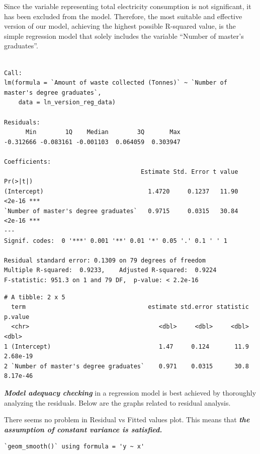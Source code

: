 \documentclass[
  11pt,
  a4paper,
  DIV=11,
  numbers=noendperiod]{scrartcl}
\begin{document}
{Since the variable representing total electricity consumption is not
significant, it has been excluded from the model.} Therefore, the most
suitable and effective version of our model, achieving the highest
possible R-squared value, is the simple regression model that solely
includes the variable ``Number of master's graduates''.

\begin{verbatim}

Call:
lm(formula = `Amount of waste collected (Tonnes)` ~ `Number of master's degree graduates`, 
    data = ln_version_reg_data)

Residuals:
      Min        1Q    Median        3Q       Max 
-0.312666 -0.083161 -0.001103  0.064059  0.303947 

Coefficients:
                                      Estimate Std. Error t value Pr(>|t|)    
(Intercept)                             1.4720     0.1237   11.90   <2e-16 ***
`Number of master's degree graduates`   0.9715     0.0315   30.84   <2e-16 ***
---
Signif. codes:  0 '***' 0.001 '**' 0.01 '*' 0.05 '.' 0.1 ' ' 1

Residual standard error: 0.1309 on 79 degrees of freedom
Multiple R-squared:  0.9233,    Adjusted R-squared:  0.9224 
F-statistic: 951.3 on 1 and 79 DF,  p-value: < 2.2e-16
\end{verbatim}

\begin{verbatim}
# A tibble: 2 x 5
  term                                  estimate std.error statistic  p.value
  <chr>                                    <dbl>     <dbl>     <dbl>    <dbl>
1 (Intercept)                              1.47     0.124       11.9 2.68e-19
2 `Number of master's degree graduates`    0.971    0.0315      30.8 8.17e-46
\end{verbatim}

{\textbf{\emph{Model adequacy checking}}} in a regression model is best
achieved by thoroughly analyzing the residuals. Below are the graphs
related to {residual analysis.}

There seems no problem in Residual vs Fitted values plot. This means
that \textbf{\emph{the assumption of constant variance is satisfied.}}

\begin{verbatim}
`geom_smooth()` using formula = 'y ~ x'
\end{verbatim}
\end{document}
